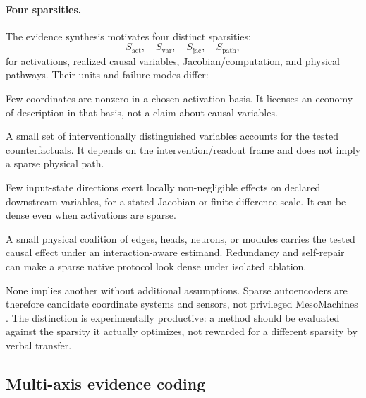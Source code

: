 \paragraph{Four sparsities.}
The evidence synthesis motivates four distinct sparsities:
\[
S_{\mathrm{act}},\quad S_{\mathrm{var}},\quad
S_{\mathrm{jac}},\quad S_{\mathrm{path}},
\]
for activations, realized causal variables, Jacobian/computation, and physical pathways. Their units and failure modes differ:
\begin{description}[style=nextline,leftmargin=1.6em]
  \item[$S_{\mathrm{act}}$ --- activation sparsity.] Few coordinates are nonzero in a chosen activation basis. It licenses an economy of description in that basis, not a claim about causal variables.
  \item[$S_{\mathrm{var}}$ --- realized-variable sparsity.] A small set of interventionally distinguished variables accounts for the tested counterfactuals. It depends on the intervention/readout frame and does not imply a sparse physical path.
  \item[$S_{\mathrm{jac}}$ --- computational sparsity.] Few input-state directions exert locally non-negligible effects on declared downstream variables, for a stated Jacobian or finite-difference scale. It can be dense even when activations are sparse.
  \item[$S_{\mathrm{path}}$ --- pathway sparsity.] A small physical coalition of edges, heads, neurons, or modules carries the tested causal effect under an interaction-aware estimand. Redundancy and self-repair can make a sparse native protocol look dense under isolated ablation.
\end{description}
None implies another without additional assumptions. Sparse autoencoders are therefore candidate coordinate systems and sensors, not privileged MesoMachines \citep{cunningham2023,gao2024sae,farnik2025,arora2026neurons,mueller2025,wu2025axbench}. The distinction is experimentally productive: a method should be evaluated against the sparsity it actually optimizes, not rewarded for a different sparsity by verbal transfer.

\subsection{Multi-axis evidence coding}
